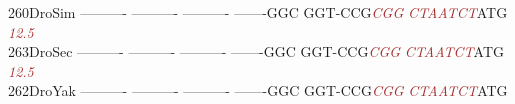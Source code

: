 \documentclass[11pt,twoside,reqno,a4paper]{article}
\begin{document}
{260\hspace*{1\charwidth}DroSim	----------	----------	----------	-------GGC	GGT-CCG\textit{\textcolor{Brown}{C}}\textit{\textcolor{Brown}{G}}\textit{\textcolor{Brown}{G}}	\textit{\textcolor{Brown}{C}}\textit{\textcolor{Brown}{T}}\textit{\textcolor{Brown}{A}}\textit{\textcolor{Brown}{A}}\textit{\textcolor{Brown}{T}}\textit{\textcolor{Brown}{C}}\textit{\textcolor{Brown}{T}}ATG	\\
\hspace*{4\charwidth}\hspace*{7\charwidth}\hspace*{1\charwidth}\hspace*{1\charwidth}\hspace*{1\charwidth}\hspace*{1\charwidth}\hspace*{47\charwidth}\textit{\textcolor{Brown}{12.5}}\hspace*{1\charwidth}\hspace*{1\charwidth}\\
263\hspace*{1\charwidth}DroSec	----------	----------	----------	-------GGC	GGT-CCG\textit{\textcolor{Brown}{C}}\textit{\textcolor{Brown}{G}}\textit{\textcolor{Brown}{G}}	\textit{\textcolor{Brown}{C}}\textit{\textcolor{Brown}{T}}\textit{\textcolor{Brown}{A}}\textit{\textcolor{Brown}{A}}\textit{\textcolor{Brown}{T}}\textit{\textcolor{Brown}{C}}\textit{\textcolor{Brown}{T}}ATG	\\
\hspace*{4\charwidth}\hspace*{7\charwidth}\hspace*{1\charwidth}\hspace*{1\charwidth}\hspace*{1\charwidth}\hspace*{1\charwidth}\hspace*{47\charwidth}\textit{\textcolor{Brown}{12.5}}\hspace*{1\charwidth}\hspace*{1\charwidth}\\
262\hspace*{1\charwidth}DroYak	----------	----------	----------	-------GGC	GGT-CCG\textit{\textcolor{Brown}{C}}\textit{\textcolor{Brown}{G}}\textit{\textcolor{Brown}{G}}	\textit{\textcolor{Brown}{C}}\textit{\textcolor{Brown}{T}}\textit{\textcolor{Brown}{A}}\textit{\textcolor{Brown}{A}}\textit{\textcolor{Brown}{T}}\textit{\textcolor{Brown}{C}}\textit{\textcolor{Brown}{T}}ATG	\\
}
\end{document}
